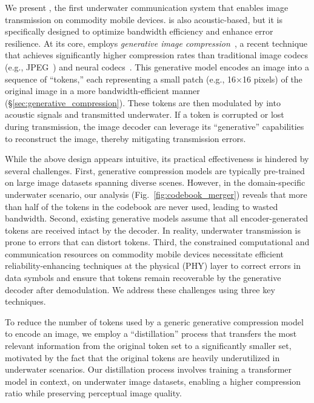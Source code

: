 We present \sysname, the first underwater communication system
that enables image transmission on commodity mobile devices.
\sysname is also acoustic-based, but it is specifically designed
to optimize bandwidth efficiency and enhance error resilience.
At its core, \sysname employs \textit{generative image
compression}~\cite{mao2024extreme,yu2024image,santurkar2018generative},
a recent technique that achieves significantly higher compression rates
than traditional image codecs (e.g., JPEG~\cite{wallace1991jpeg})
and neural codecs~\cite{cheng2020image}.
This generative model encodes an image into a sequence of
``tokens,'' each representing a small patch (e.g., 16$\times$16 pixels) of the
original image in a more bandwidth-efficient manner
(\S\ref{sec:generative_compression}).
These tokens are then modulated by \sysname into acoustic signals
and transmitted underwater.
If a token is corrupted or lost during transmission,
the image decoder can leverage its ``generative'' capabilities
to reconstruct the image, thereby mitigating transmission errors.

While the above design appears intuitive, its practical effectiveness
is hindered by several challenges.
First, generative compression models are typically pre-trained on large
image datasets spanning diverse scenes. However, in the domain-specific
underwater scenario, our analysis (Fig.~\ref{fig:codebook_merger}) reveals
that more than half of the tokens in the codebook are never used,
leading to wasted bandwidth.
Second, existing generative models assume that all encoder-generated tokens
are received intact by the decoder. In reality, underwater transmission
is prone to errors that can distort tokens.
Third, the constrained computational and communication resources on commodity mobile devices
necessitate efficient reliability-enhancing techniques at the physical (PHY)
layer to correct errors in data symbols and ensure that tokens
remain recoverable by the generative decoder after demodulation.
We address these challenges using three key techniques.

To reduce the number of tokens used by a generic generative
compression model to encode an image, we employ a ``distillation'' process
that transfers the most relevant information from the original token set
to a significantly smaller set, motivated by the fact that the original
tokens are heavily underutilized in underwater scenarios.
Our distillation process involves training a transformer model in context,
on underwater image datasets, enabling a higher compression ratio
while preserving perceptual image quality.

